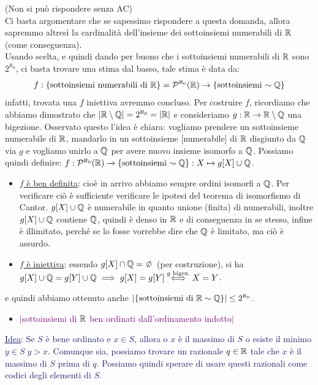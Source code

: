 \begin{soln}
	(Non si pu\`o rispondere senza AC)\\
	Ci basta argomentare che se sapessimo rispondere a questa domanda, allora sapremmo altres\`i la cardinalit\`a dell'insieme dei sottoinsiemi numerabili di $\mathbb R$ (come conseguenza).\\
	Usando scelta, e quindi dando per buono che i sottoinsiemi numerabili di $\mathbb R$ sono $2^{\aleph_0}$, ci basta trovare una stima dal basso, tale stima \`e data da:
	\[ f : \{\text{sottoinsiemi numerabili di $\mathbb R$}\} = \mathcal{P}^{\aleph_0}(\mathbb R) \to \{\text{sottoinsiemi $\sim \mathbb Q$}\}
		\]
	infatti, trovata una $f$ iniettiva avremmo concluso. Per costruire $f$, ricordiamo che abbiamo dimostrato che $|\mathbb R \setminus \mathbb Q| = 2^{\aleph_0} = |\mathbb R|$ e consideriamo $g : \mathbb R \to \mathbb R \setminus \mathbb Q$ una bigezione.
	Osservato questo l'idea \`e chiara: vogliamo prendere un sottoinsieme numerabile di $\mathbb R$, mandarlo in un sottoinsieme [numerabile] di $\mathbb R$ disgiunto da $\mathbb Q$ via $g$ e vogliamo unirlo a $\mathbb Q$ per avere nuovo insieme isomorfo a $\mathbb Q$.
	Possiamo quindi definire: $f : \mathcal{P}^{\aleph_0}(\mathbb R) \to \{\text{sottoinsiemi $\sim \mathbb Q$}\} : X \mapsto g[X] \cup \mathbb Q$.
	\begin{itemize}
		\item[*] \underline{$f$ \`e ben definita}: cio\`e in arrivo abbiamo sempre ordini isomorfi a $\mathbb Q$. Per verificare ci\`o \`e sufficiente verificare le ipotesi del teorema di isomorfismo di Cantor. $g[X] \cup \mathbb Q$ \`e numerabile in quanto unione (finita) di numerabili, inoltre $g[X] \cup \mathbb Q$ contiene $\mathbb Q$, quindi \`e denso in $\mathbb R$ e di conseguenza
		in se stesso, infine \`e illimitato, perch\'e se lo fosse vorrebbe dire che $\mathbb Q$ \`e limitato, ma ci\`o \`e assurdo.
		\item[*] \underline{$f$ \`e iniettiva}: essendo $g[X] \cap \QQ = \emptyset$ (per costruzione), si ha $g[X] \cup \mathbb Q = g[Y] \cup \mathbb Q \implies g[X] = g[Y] \overset{\text{$g$ bigez.}}{\iff} X = Y$.
	\end{itemize}
	e quindi abbiamo ottenuto anche $|\{\text{sottoinsiemi di $\mathbb R \sim \mathbb Q$}\}| \leq 2^{\aleph_0}$.
\end{soln}

\begin{itemize}
	\item \textcolor{purple}{$|$sottoinsiemi di $\mathbb R$ ben ordinati dall'ordinamento indotto$|$}
\end{itemize}

\textcolor{MidnightBlue}{\underline{Idea}: Se $S$ \`e bene ordinato e $x \in S$, allora o $x$ \`e il massimo di $S$ o esiste il minimo $y \in S \; y > x$. Comunque sia, possiamo trovare un razionale $q \in \mathbb R$ tale che $x$ \`e il massimo di $S$ prima di $q$.
Possiamo quindi sperare di usare questi razionali come codici degli elementi di $S$.} 

